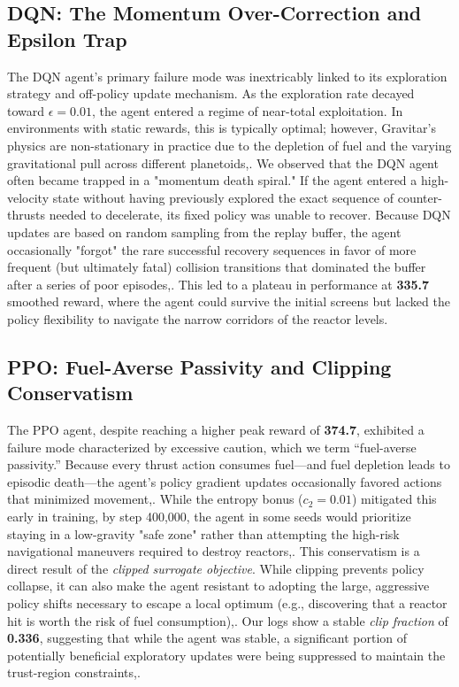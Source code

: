 \documentclass[conference]{IEEEtran}
\begin{document}
\subsection{DQN: The Momentum Over-Correction and Epsilon Trap}
The DQN agent's primary failure mode was inextricably linked to its exploration strategy and off-policy update mechanism.
As the exploration rate decayed toward $\epsilon=0.01$, the agent entered a regime of near-total exploitation.
In environments with static rewards, this is typically optimal; however, Gravitar's physics are non-stationary in practice due to the depletion of fuel and the varying gravitational pull across different planetoids,.
We observed that the DQN agent often became trapped in a "momentum death spiral."
If the agent entered a high-velocity state without having previously explored the exact sequence of counter-thrusts needed to decelerate, its fixed policy was unable to recover.
Because DQN updates are based on random sampling from the replay buffer, the agent occasionally "forgot" the rare successful recovery sequences in favor of more frequent (but ultimately fatal) collision transitions that dominated the buffer after a series of poor episodes,.
This led to a plateau in performance at \textbf{335.7} smoothed reward, where the agent could survive the initial screens but lacked the policy flexibility to navigate the narrow corridors of the reactor levels.

\subsection{PPO: Fuel-Averse Passivity and Clipping Conservatism}
The PPO agent, despite reaching a higher peak reward of \textbf{374.7}, exhibited a failure mode characterized by excessive caution, which we term ``fuel-averse passivity.'' Because every thrust action consumes fuel—and fuel depletion leads to episodic death—the agent's policy gradient updates occasionally favored actions that minimized movement,.
While the entropy bonus ($c_2 = 0.01$) mitigated this early in training, by step 400,000, the agent in some seeds would prioritize staying in a low-gravity "safe zone" rather than attempting the high-risk navigational maneuvers required to destroy reactors,.
This conservatism is a direct result of the \textit{clipped surrogate objective}.
While clipping prevents policy collapse, it can also make the agent resistant to adopting the large, aggressive policy shifts necessary to escape a local optimum (e.g., discovering that a reactor hit is worth the risk of fuel consumption),.
Our logs show a stable \textit{clip fraction} of \textbf{0.336}, suggesting that while the agent was stable, a significant portion of potentially beneficial exploratory updates were being suppressed to maintain the trust-region constraints,.
\end{document}
